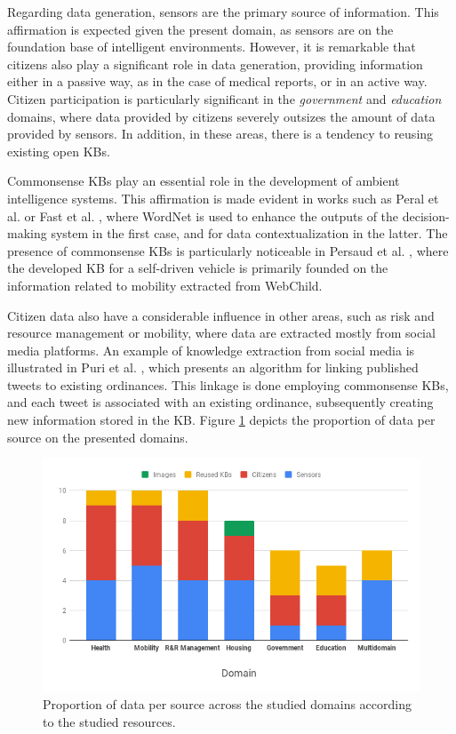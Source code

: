 Regarding data generation, sensors are the primary source of information. This affirmation is expected given the present domain, as sensors are on the foundation base of intelligent environments. However, it is  remarkable that citizens also play a significant role in data generation, providing information either in a passive way, as in the case of medical reports, or in an active way. Citizen participation is particularly significant in the \textit{government} and \textit{education} domains, where data provided by citizens severely outsizes the amount of data provided by sensors. In addition, in these areas, there is a tendency to reusing existing open KBs. 

Commonsense KBs play an essential role in the development of ambient intelligence systems. This affirmation is made evident in works such as Peral et al. \citep{peraletal} or Fast et al. \citep{fastetal}, where WordNet is used to enhance the outputs of the decision-making system in the first case, and for data contextualization in the latter. The presence of commonsense KBs is particularly noticeable in Persaud et al. \citep{persaudetal}, where the developed KB for a self-driven vehicle is primarily founded on the information related to mobility extracted from WebChild.

Citizen data also have a considerable influence in other areas, such as risk and resource management or mobility, where data are extracted mostly from social media platforms. An example of knowledge extraction from social media is illustrated in Puri et al. \citep{PurietAl}, which presents an algorithm for linking published tweets to existing ordinances. This linkage is done employing commonsense KBs, and each tweet is associated with an existing ordinance, subsequently creating new information stored in the KB. Figure \ref{fig:proportion} depicts the proportion of data per source on the presented domains.
\unskip
\begin{figure}[H]
    \centering
    \includegraphics[width=12.5cm]{2_stateoftheart/figures/data_proportion.png}
    \caption{Proportion of data per source across the studied domains according to the studied resources.}
    \label{fig:proportion}
\end{figure}

